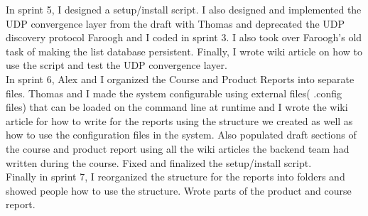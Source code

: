 In sprint 5,
I designed a setup/install script.
I also designed and implemented the UDP convergence layer from the draft with Thomas and deprecated the UDP discovery protocol Faroogh and I coded in sprint 3. 
I also took over Faroogh's old task of making the list database persistent. 
Finally, I wrote wiki article on how to use the script and test the UDP convergence layer. \\

In sprint 6,
Alex and I organized the Course and Product Reports into separate files.
Thomas and I made the system configurable using external files( .config files) that can be loaded on the command line at runtime and
I wrote the wiki article for how to write for the reports using the structure we created as well as how to use the configuration files in the system.
Also populated draft sections of the course and product report using all the wiki articles the backend team had written during the course.
Fixed and finalized the setup/install script.\\

Finally in sprint 7,
I reorganized the structure for the reports into folders and showed people how to use the structure.
Wrote parts of the product and course report.\\
